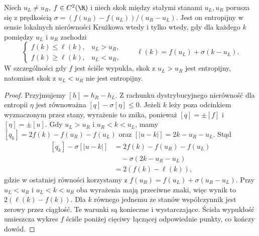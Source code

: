 \begin{twierdzenie}
\label{thm:pde24-entropyshock}
Niech $u_L\ne u_R$, $f\in C^2(\R)$ i niech skok między
stałymi stanami $u_L,u_R$ porusza się z prędkością
$\sigma=(f(u_R)-f(u_L))/(u_R-u_L)$.
Jest on entropijny w sensie lokalnych nierówności
Krużkowa wtedy i tylko wtedy, gdy dla każdego $k$ pomiędzy
$u_L$ i $u_R$ zachodzi
\begin{equation}\label{eq:pde24-chord}
 \begin{cases}
 f(k)\le \ell(k),&u_L>u_R,\\
 f(k)\ge \ell(k),&u_L<u_R,
 \end{cases}
 \qquad
 \ell(k)=f(u_L)+\sigma(k-u_L).
\end{equation}
W szczególności gdy $f$ jest ściśle wypukła, skok z
$u_L>u_R$ jest entropijny, natomiast skok z $u_L<u_R$
nie jest entropijny.
\end{twierdzenie}
\begin{proof}
Przyjmujemy $[h]=h_R-h_L$. Z rachunku dystrybucyjnego
nierówność dla entropii $\eta$ jest równoważna
$[q]-\sigma[\eta]\le0$. Jeżeli $k$ leży poza odcinkiem
wyznaczonym przez stany, wyrażenie to znika, ponieważ
$[q]=\pm[f]$ i $[\eta]=\pm[u]$.
Gdy $u_L>u_R$ i $u_R<k<u_L$, mamy
$[q_k]=2f(k)-f(u_R)-f(u_L)$ oraz
$[|u-k|]=2k-u_R-u_L$. Stąd
\[
 \begin{aligned}
 [q_k]-\sigma[|u-k|]
 &=2f(k)-f(u_R)-f(u_L)\\
 &\quad-\sigma(2k-u_R-u_L)\\
 &=2(f(k)-\ell(k)),
 \end{aligned}
\]
gdzie w ostatniej równości korzystamy z
$f(u_R)=f(u_L)+\sigma(u_R-u_L)$.
Przy $u_L<u_R$ i $u_L<k<u_R$ oba wyrażenia
mają przeciwne znaki, więc wynik to
$2(\ell(k)-f(k))$. Dla $k$ równego jednemu ze
stanów współczynnik jest zerowy przez ciągłość.
Te warunki są konieczne i wystarczające. Ścisła wypukłość
umieszcza wykres $f$ ściśle poniżej cięciwy łączącej
odpowiednie punkty, co kończy dowód.
\end{proof}

